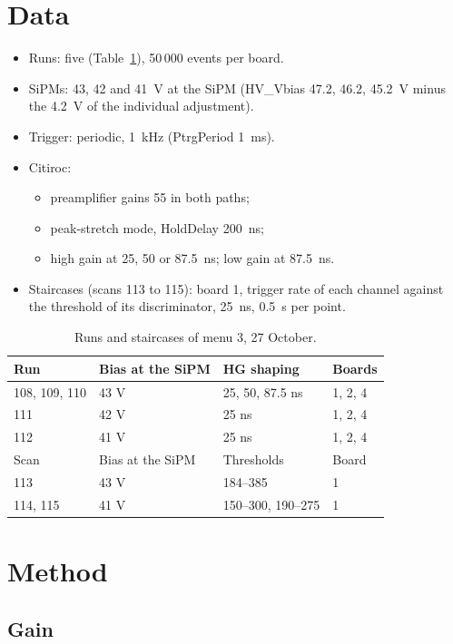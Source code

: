 \documentclass[11pt,a4paper]{article}
\begin{document}
\section{Data}

\begin{itemize}
\item Runs: five (Table~\ref{tab:runs}), 50\,000 events per board.
\item SiPMs: 43, 42 and 41~V at the SiPM (HV\_Vbias 47.2, 46.2, 45.2~V minus the 4.2~V of
  the individual adjustment).
\item Trigger: periodic, 1~kHz (PtrgPeriod 1~ms).
\item Citiroc:
  \begin{itemize}
  \item preamplifier gains 55 in both paths;
  \item peak-stretch mode, HoldDelay 200~ns;
  \item high gain at 25, 50 or 87.5~ns; low gain at 87.5~ns.
  \end{itemize}
\item Staircases (scans 113 to 115): board 1, trigger rate of each channel against the
  threshold of its discriminator, 25~ns, 0.5~s per point.
\end{itemize}

\begin{table}[H]
\centering
\small
\begin{tabular}{llll}
\toprule
Run & Bias at the SiPM & HG shaping & Boards \\
\midrule
108, 109, 110 & 43 V & 25, 50, 87.5 ns & 1, 2, 4 \\
111 & 42 V & 25 ns & 1, 2, 4 \\
112 & 41 V & 25 ns & 1, 2, 4 \\
\midrule
Scan & Bias at the SiPM & Thresholds & Board \\
\midrule
113 & 43 V & 184--385 & 1 \\
114, 115 & 41 V & 150--300, 190--275 & 1 \\
\bottomrule
\end{tabular}
\caption{Runs and staircases of menu 3, 27 October.}
\label{tab:runs}
\end{table}

\section{Method}

\subsection{Gain}
\end{document}
